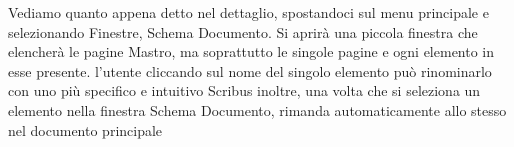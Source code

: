 \documentclass[a4paper, 12pt]{book}
\begin{document}
Vediamo quanto appena detto nel dettaglio, spostandoci sul menu principale e selezionando Finestre, Schema Documento. Si aprirà una piccola finestra che elencherà le pagine Mastro, ma soprattutto le singole pagine e ogni elemento in esse presente. 
l'utente cliccando sul nome del singolo elemento può rinominarlo con uno più specifico e intuitivo
Scribus inoltre, una volta che si seleziona un elemento nella finestra Schema Documento, rimanda automaticamente allo stesso nel documento principale






	
\end{document}
